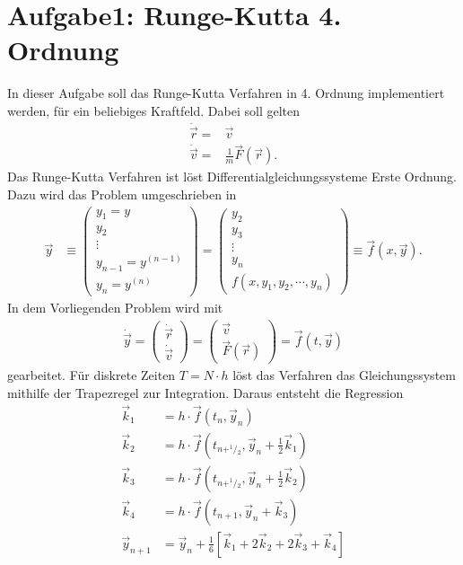 
\section*{Aufgabe1: Runge-Kutta 4. Ordnung}
In dieser Aufgabe soll das Runge-Kutta Verfahren in 4. Ordnung implementiert werden, für ein beliebiges Kraftfeld.
Dabei soll gelten
\begin{align}
	\dot{\vec{r}}=&\vec{v}\\
	\dot{\vec{v}}=&\frac{1}{m}\vec{F}(\vec{r}).
\end{align}
Das Runge-Kutta Verfahren ist löst Differentialgleichungssysteme Erste Ordnung. Dazu wird das Problem umgeschrieben in
\begin{align}
	\vec{y}&\equiv
	\begin{pmatrix}
	y_1=y\\ y_2\\ \vdots\\y_{n-1}=y^{(n-1)}\\ y_n=y^{(n)}
	\end{pmatrix}=
	\begin{pmatrix}
		y_2\\y_3\\\vdots\\y_n\\f(x,y_1,y_2,\cdots,y_n)
	\end{pmatrix}
	\equiv\vec{f}(x,\vec{y}).
\end{align}
In dem Vorliegenden Problem wird mit
\begin{align}
	\dot{\vec{y}}=\begin{pmatrix}
		\dot{\vec{r}}\\\dot{\vec{v}}
	\end{pmatrix}
	=
	\begin{pmatrix}
	\vec{v}\\\vec{F}(\vec{r})	
	\end{pmatrix}
	=\vec{f}(t,\vec{y})
\end{align}
gearbeitet.
Für diskrete Zeiten $T= N\cdot h$ löst das Verfahren das Gleichungssystem mithilfe der Trapezregel zur Integration.
Daraus entsteht die Regression
\begin{align}
	\vec{k}_1&=h\cdot \vec{f}(t_n , \vec{y}_n)\\
	\vec{k}_2&=h\cdot \vec{f}\left(t_{n+^1\!/\!_2},\vec{y}_n+\frac{1}{2}\vec{k}_1\right)\\
	\vec{k}_3&=h\cdot \vec{f}\left(t_{n+^1\!/\!_2},\vec{y}_n+\frac{1}{2}\vec{k}_2\right)\\
	\vec{k}_4&=h\cdot \vec{f}\left(t_{n+1},\vec{y}_n+\vec{k}_3\right)\\
	\vec{y}_{n+1}&=\vec{y}_n + \frac{1}{6}\left[ \vec{k}_1 + 2 \vec{k}_2 +2\vec{k}_3 +\vec{k}_4 \right]
\end{align} 
